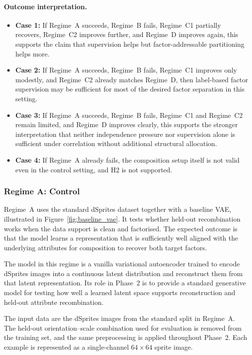 \paragraph{Outcome interpretation.}
\begin{itemize}
    \item \textbf{Case 1:} If Regime~A succeeds, Regime~B fails, Regime~C1 partially recovers, Regime~C2 improves
    further, and Regime~D improves again, this supports the claim that supervision helps but
    factor-addressable partitioning helps more.
    \item \textbf{Case 2:} If Regime~A succeeds, Regime~B fails, Regime~C1 improves only modestly, and
    Regime~C2 already matches Regime~D, then label-based factor supervision may be sufficient for most of the
    desired factor separation in this setting.
    \item \textbf{Case 3:} If Regime~A succeeds, Regime~B fails, Regime~C1 and Regime~C2 remain limited, and
    Regime~D improves clearly, this supports the stronger interpretation that neither independence
    pressure nor supervision alone is sufficient under correlation without additional structural
    allocation.
    \item \textbf{Case 4:} If Regime~A already fails, the composition setup itself is not valid even in the control
    setting, and H2 is not supported.
\end{itemize}

\subsubsection{Regime A: Control}

Regime~A uses the standard dSprites dataset together with a baseline VAE, illustrated in Figure~\ref{fig:baseline_vae}. It tests whether
held-out recombination works when the data support is clean and factorised. The expected
outcome is that the model learns a representation that is sufficiently well aligned with
the underlying attributes for composition to recover both target factors.

The model in this regime is a vanilla variational autoencoder trained to encode dSprites
images into a continuous latent distribution and reconstruct them from that latent representation.
Its role in Phase~2 is to provide a standard generative model for testing how well a learned
latent space supports reconstruction and held-out attribute recombination.

The input data are the dSprites images from the standard split in Regime~A. The held-out
orientation--scale combination used for evaluation is removed from the training set, and the same
preprocessing is applied throughout Phase~2. Each example is represented as a single-channel
$64 \times 64$ sprite image.

